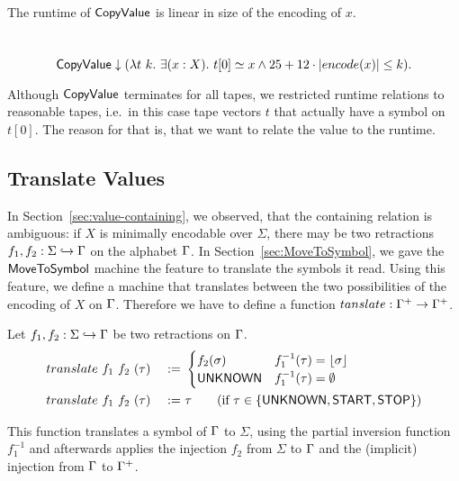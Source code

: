 The runtime of $\mathsf{CopyValue}$ is linear in size of the encoding of $x$.
\begin{lemma}
  \label{lem:CopyValue_TerminatesIn}
  ~
  \[
    \mathsf{CopyValue} \mathrel{\downarrow} (\lambda t~k.~\exists(x:X).~t[0] \simeq x \land 25 + 12 \cdot \left| encode(x) \right| \leq k).
  \]
\end{lemma}

Although $\mathsf{CopyValue}$ terminates for all tapes, we restricted runtime relations to reasonable tapes, i.e.\ in this case tape vectors $t$ that
actually have a symbol on $t[0]$.  The reason for that is, that we want to relate the value to the runtime.

\subsection{Translate Values}
\label{sec:Translate}

In Section~\ref{sec:value-containing}, we observed, that the containing relation is ambiguous: if $X$ is minimally encodable over $\Sigma$, there may
be two retractions $f_1, f_2 : \Sigma \hookrightarrow \Gamma$ on the alphabet $\Gamma$.  In Section~\ref{sec:MoveToSymbol}, we gave the
$\mathsf{MoveToSymbol}$ machine the feature to translate the symbols it read.  Using this feature, we define a machine that translates between the two
possibilities of the encoding of $X$ on $\Gamma$.  Therefore we have to define a function $tanslate : \Gamma^+ \rightarrow \Gamma^+$.

\begin{definition}
  \label{def:translate}
  Let $f_1, f_2 : \Sigma \hookrightarrow \Gamma$ be two retractions on $\Gamma$.
  \begin{alignat*}{2}
    & translate~f_1~f_2~(\tau) &~:=~&
    \begin{cases}
      f_2(\sigma)  & f_1^{-1}(\tau) = \left\lfloor {\sigma} \right\rfloor \\
      \mathsf{UNKNOWN} & f_1^{-1}(\tau) = \emptyset
    \end{cases} \\
    & translate~f_1~f_2~(\tau) &~:=~& \tau \qquad\text{(if $\tau \in \{\mathsf{UNKNOWN}, \mathsf{START}, \mathsf{STOP}\}$)} 
  \end{alignat*}
\end{definition}

This function translates a symbol of $\Gamma$ to $\Sigma$, using the partial inversion function $f_1^{-1}$ and afterwards applies the injection $f_2$
from $\Sigma$ to $\Gamma$ and the (implicit) injection from $\Gamma$ to $\Gamma^+$.

